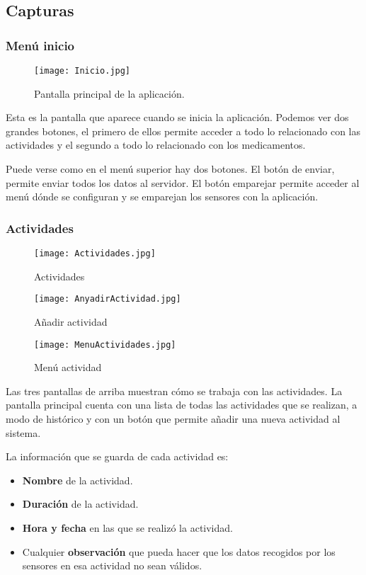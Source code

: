\documentclass[11pt,spanish]{article}
\begin{document}
\subsection{Capturas}
\subsubsection{Menú inicio}
\begin{figure}[!htb]
\centering
\texttt{[image: Inicio.jpg]}
\caption{Pantalla principal de la aplicación.}
\end{figure}
Esta es la pantalla que aparece cuando se inicia la aplicación. Podemos ver dos grandes botones, el primero de ellos permite acceder a todo lo relacionado con las actividades y el segundo a todo lo relacionado con los medicamentos.
\newline

Puede verse como en el menú superior hay dos botones. El botón de enviar, permite enviar todos los datos al servidor. El botón emparejar permite acceder al menú dónde se configuran y se emparejan los sensores con la aplicación.
\newpage

\subsubsection{Actividades}
\begin{figure}[!htb]
  \texttt{[image: Actividades.jpg]}
  \caption{Actividades}
\endminipage\hfill
{}
  \texttt{[image: AnyadirActividad.jpg]}
  \caption{Añadir actividad}
\endminipage\hfill
{}%
  \texttt{[image: MenuActividades.jpg]}
  \caption{Menú actividad}
\endminipage
\end{figure}

Las tres pantallas de arriba muestran cómo se trabaja con las actividades. La pantalla principal cuenta con una lista de todas las actividades que se realizan, a modo de histórico y con un botón que permite añadir una nueva actividad al sistema.
\newline

La información que se guarda de cada actividad es:

\begin{itemize}
	\item {\bf Nombre} de la actividad.
	\item {\bf Duración} de la actividad.
	\item {\bf Hora y fecha} en las que se realizó la actividad.
	\item Cualquier {\bf observación} que pueda hacer que los datos recogidos por los sensores en esa actividad no sean válidos.
\end{itemize}
\end{document}
